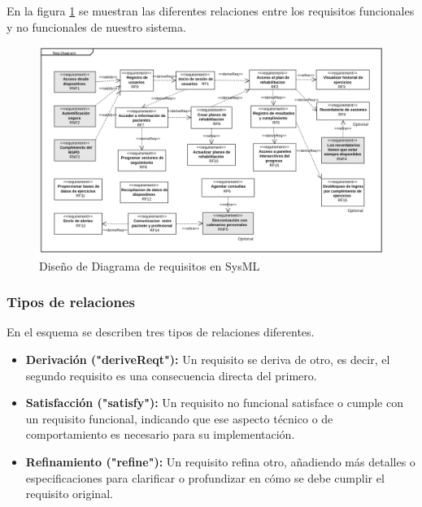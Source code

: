 \documentclass{article}
\begin{document}
En la figura \ref{fig:SysML} se muestran las diferentes relaciones entre los requisitos funcionales y no funcionales de nuestro sistema.

\begin{figure}
	\begin{center} 
		\includegraphics[width=1\textwidth]{images/SysML.png}
		\caption{Diseño de Diagrama de requisitos en SysML}
		\label{fig:SysML}
	\end{center}
\end{figure}
\vspace{5cm}

\subsubsection{Tipos de relaciones}
En el esquema se describen tres tipos de relaciones diferentes.

\begin{itemize}
	\item \textbf{Derivación ("deriveReqt"):} Un requisito se deriva de otro, es decir, el segundo requisito es una consecuencia directa del primero.
	\item \textbf{Satisfacción ("satisfy"):} Un requisito no funcional satisface o cumple con un requisito funcional, indicando que ese aspecto técnico o de comportamiento es necesario para su implementación.
	\item \textbf{Refinamiento ("refine"):} Un requisito refina otro, añadiendo más detalles o especificaciones para clarificar o profundizar en cómo se debe cumplir el requisito original.
\end{itemize}
\end{document}

